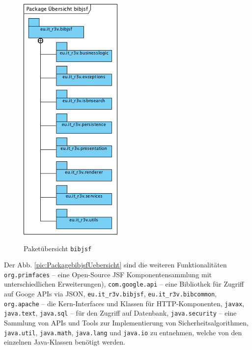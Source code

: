 \documentclass[fontsize=12pt,paper=a4,twoside]{scrartcl}
\begin{document}
\begin{figure} [H] 
\caption{Paketübersicht \texttt{bibjsf}} \centering
 \includegraphics[width=0.45\textwidth]{Diagramme/Packagebibjsfuebersicht.png} 
 \label{pic:Packagebibjsf} 
\end{figure}

Der Abb. \vref{pic:PackagebibjsfUebersicht} sind die weiteren Funktionalitäten \texttt{org.primfaces} -- eine Open-Source JSF Komponentensammlung mit unterschiedlichen Erweiterungen), \texttt{com.google.api} -- eine Bibliothek für Zugriff auf Googe APIs via JSON, \texttt{eu.it\_r3v.bibjsf}, \texttt{eu.it\_r3v.bibcommon}, \texttt{org.apache} -- die Kern-Interfaces und Klassen für HTTP-Komponenten, \texttt{javax}, \texttt{java.text}, \texttt{java.sql} -- für den Zugriff auf Datenbank, \texttt{java.security} -- eine Sammlung von APIs und Tools zur Implementierung von Sicherheitsalgorithmen, \texttt{java.util}, \texttt{java.math}, \texttt{java.lang} und \texttt{java.io} zu entnehmen, welche von den einzelnen Java-Klassen benötigt werden.
\end{document}
